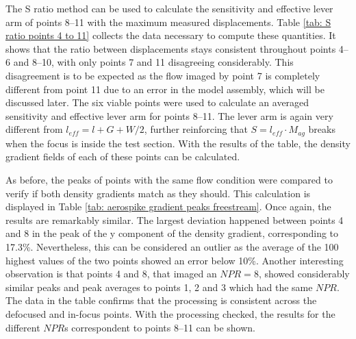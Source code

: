 The S ratio method can be used to calculate the sensitivity and effective lever arm of points 8--11 with the maximum measured displacements. Table \ref{tab: S ratio points 4 to 11} collects the data necessary to compute these quantities. It shows that the ratio between displacements stays consistent throughout points 4--6 and 8--10, with only points 7 and 11 disagreeing considerably. This disagreement is to be expected as the flow imaged by point 7 is completely different from point 11 due to an error in the model assembly, which will be discussed later. The six viable points were used to calculate an averaged sensitivity and effective lever arm for points 8--11. The lever arm is again very different from $l_{eff} = l + G + W/2$, further reinforcing that $S = l_{eff} \cdot M_{ag}$ breaks when the focus is inside the test section. With the results of the table, the density gradient fields of each of these points can be calculated.

As before, the peaks of points with the same flow condition were compared to verify if both density gradients match as they should. This calculation is displayed in Table \ref{tab: aerospike gradient peaks freestream}. Once again, the results are remarkably similar. The largest deviation happened between points 4 and 8 in the peak of the y component of the density gradient, corresponding to 17.3\%. Nevertheless, this can be considered an outlier as the average of the 100 highest values of the two points showed an error below 10\%. Another interesting observation is that points 4 and 8, that imaged an $NPR = 8$, showed considerably similar peaks and peak averages to points 1, 2 and 3 which had the same $NPR$. The data in the table confirms that the processing is consistent across the defocused and in-focus points. With the processing checked, the results for the different $NPR$s correspondent to points 8--11 can be shown.



